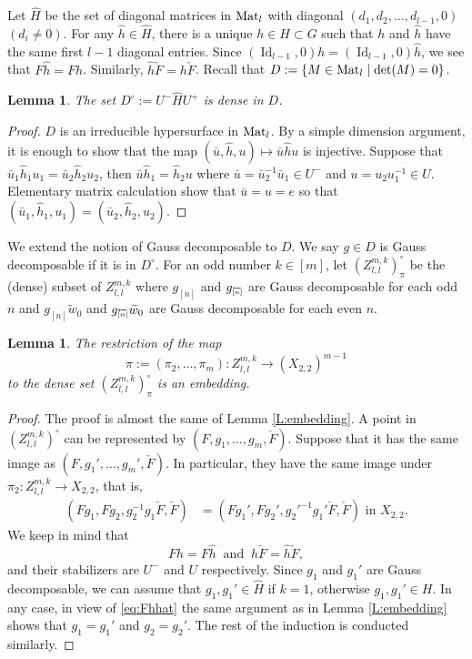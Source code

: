 \documentclass{amsart}
\newtheorem{lemma}[theorem]{Lemma}
\theoremstyle{definition}
\theoremstyle{remark}
\numberwithin{equation}{section}
\DeclareMathOperator{\Id}{Id}
\newcommand{\wtd}[1]{\widetilde{#1}}
\newcommand{\invint}[1]{{\scriptsize \overleftarrow{[#1]}}}
\begin{document}
Let $\hat{H}$ be the set of diagonal matrices in ${\rm Mat}_l$ with diagonal $(d_1,d_2,\dots,d_{l-1},0)$ $(d_i\neq 0)$.
For any $\hat{h}\in \hat{H}$, there is a unique $h\in H\subset G$ such that $h$ and $\hat{h}$ have the same first $l-1$ diagonal entries.
Since $(\Id_{l-1},0)h = (\Id_{l-1},0)\hat{h}$, we see that $F\hat{h} = Fh$. Similarly, $\hat{h}\check{F} = h\check{F}$.
Recall that $D:=\{M\in {\rm Mat}_l \mid \det(M)=0\}$.

\begin{lemma} The set $D^\circ:=U^-\hat{H}U^+$ is dense in $D$.	
\end{lemma}

\begin{proof} $D$ is an irreducible hypersurface in ${\rm Mat}_l$. By a simple dimension argument, 
it is enough to show that the map $(\bar{u},\hat{h},u)\mapsto \bar{u}\hat{h}u$ is injective.
Suppose that $\bar{u}_1\hat{h}_1u_1=\bar{u}_2\hat{h}_2u_2$, then $\bar{u}\hat{h}_1 = \hat{h}_2u$ where $\bar{u}=\bar{u}_2^{-1}\bar{u}_1\in U^-$ and $u=u_2u_1^{-1}\in U$.
Elementary matrix calculation show that $\bar{u}=u=e$ so that $(\bar{u}_1,\hat{h}_1,u_1)=(\bar{u}_2,\hat{h}_2,u_2)$.
\end{proof}

We extend the notion of Gauss decomposable to $D$. We say $g\in D$ is Gauss decomposable if it is in $D^\circ$.
For an odd number $k\in[m]$, let $(Z_{l,l}^{m,k})^\circ_\pi$ be the (dense) subset of $Z_{l,l}^{m,k}$ where $g_{[n]}$ and $g_{\invint{n}}$ are Gauss decomposable for each odd $n$ and $g_{[n]}\wtd{w}_0$ and $g_{\invint{n}}\wtd{w}_0$ are Gauss decomposable for each even $n$.

\begin{lemma} \label{L:embeddingk} The restriction of the map 
	$$\pi:=(\pi_2,\dots,\pi_{m}): Z_{l,l}^{m,k}\to (X_{2,2})^{m-1}$$ 
	to the dense set $(Z_{l,l}^{m,k})^\circ_\pi$ is an embedding.
\end{lemma}

\begin{proof} The proof is almost the same of Lemma \ref{L:embedding}.
	A point in $(Z_{l,l}^{m,k})^\circ$ can be represented by $(F,g_1,\dots,g_m,\check{F})$.
	Suppose that it has the same image as $(F,g_1',\dots,g_m',\check{F})$.
	In particular, they have the same image under $\pi_2: Z_{l,l}^{m,k}\to X_{2,2}$, that is,
	\begin{align*} 
	(Fg_1,Fg_2,g_2^{-1}g_1\check{F},\check{F})&=(Fg_1',Fg_2',{g_2'}^{-1}g_1'\check{F},\check{F}) \text{ in } X_{2,2}. 
	\end{align*}
	We keep in mind that \begin{equation} \label{eq:Fhhat} Fh=F\hat{h}\ \text{ and }\ h\check{F}=\hat{h}\check{F},\end{equation}
	and their stabilizers are $U^-$ and $U$ respectively.
	Since $g_1$ and  $g_1'$ are Gauss decomposable, we can assume that $g_1,g_1'\in \hat{H}$ if $k=1$, otherwise $g_1,g_1'\in H$. 
    In any case, in view of \eqref{eq:Fhhat} the same argument as in Lemma \ref{L:embedding} shows that $g_1=g_1'$ and $g_2=g_2'$. 
    The rest of the induction is conducted similarly.	
\end{proof}
\end{document}
